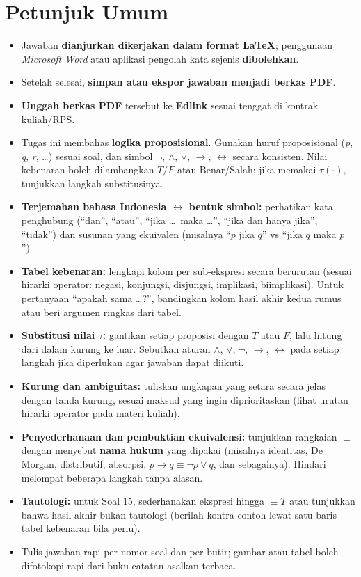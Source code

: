 \documentclass[12pt,a4paper]{article}
\theoremstyle{soaljarak}
\begin{document}
\section*{Petunjuk Umum}
\begin{itemize}[leftmargin=*]
  \item Jawaban \textbf{dianjurkan dikerjakan dalam format \LaTeX}; penggunaan \textit{Microsoft Word} atau aplikasi pengolah kata sejenis \textbf{dibolehkan}.
  \item Setelah selesai, \textbf{simpan atau ekspor jawaban menjadi berkas PDF}.
  \item \textbf{Unggah berkas PDF} tersebut ke \textbf{Edlink} sesuai tenggat di kontrak kuliah/RPS.
  \item Tugas ini membahas \textbf{logika proposisional}. Gunakan huruf proposisional (\textit{p}, \textit{q}, \textit{r}, \ldots) sesuai soal, dan simbol \(\neg\), \(\wedge\), \(\vee\), \(\rightarrow\), \(\leftrightarrow\) secara konsisten. Nilai kebenaran boleh dilambangkan \(T/F\) atau Benar/Salah; jika memakai \(\tau(\cdot)\), tunjukkan langkah substitusinya.
  \item \textbf{Terjemahan bahasa Indonesia \(\leftrightarrow\) bentuk simbol:} perhatikan kata penghubung (``dan'', ``atau'', ``jika \ldots\ maka \ldots'', ``jika dan hanya jika'', ``tidak'') dan susunan yang ekuivalen (misalnya ``\(p\) jika \(q\)'' vs ``jika \(q\) maka \(p\)'').
  \item \textbf{Tabel kebenaran:} lengkapi kolom per sub-ekspresi secara berurutan (sesuai hirarki operator: negasi, konjungsi, disjungsi, implikasi, biimplikasi). Untuk pertanyaan ``apakah sama \ldots?'', bandingkan kolom hasil akhir kedua rumus atau beri argumen ringkas dari tabel.
  \item \textbf{Substitusi nilai \(\tau\):} gantikan setiap proposisi dengan \(T\) atau \(F\), lalu hitung dari dalam kurung ke luar. Sebutkan aturan \(\wedge\), \(\vee\), \(\neg\), \(\rightarrow\), \(\leftrightarrow\) pada setiap langkah jika diperlukan agar jawaban dapat diikuti.
  \item \textbf{Kurung dan ambiguitas:} tuliskan ungkapan yang setara secara jelas dengan tanda kurung, sesuai maksud yang ingin diprioritaskan (lihat urutan hirarki operator pada materi kuliah).
  \item \textbf{Penyederhanaan dan pembuktian ekuivalensi:} tunjukkan rangkaian \(\equiv\) dengan menyebut \textbf{nama hukum} yang dipakai (misalnya identitas, De Morgan, distributif, absorpsi, \(p\rightarrow q \equiv \neg p \vee q\), dan sebagainya). Hindari melompat beberapa langkah tanpa alasan.
  \item \textbf{Tautologi:} untuk Soal 15, sederhanakan ekspresi hingga \(\equiv T\) atau tunjukkan bahwa hasil akhir bukan tautologi (berilah kontra-contoh lewat satu baris tabel kebenaran bila perlu).
  \item Tulis jawaban rapi per nomor soal dan per butir; gambar atau tabel boleh difotokopi rapi dari buku catatan asalkan terbaca.
\end{itemize}
\end{document}
